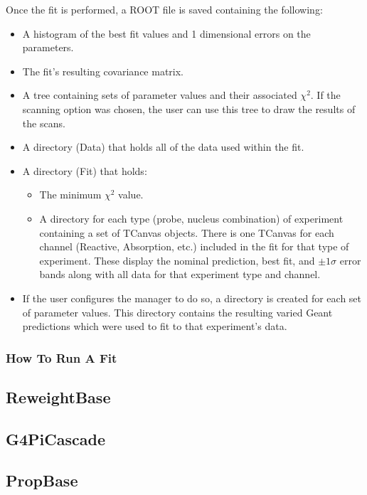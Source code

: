 \documentclass[12pt]{article}
\begin{document}
Once the fit is performed, a ROOT file is saved containing the following:
\begin{itemize}
	\item A histogram of the best fit values and 1 dimensional errors on the parameters.
	\item The fit's resulting covariance matrix.
	\item A tree containing sets of parameter values and their associated $\chi^2$. If the scanning option was chosen, the user can use this tree to draw the results of the scans.
	\item A directory (Data) that holds all of the data used within the fit.
	\item A directory (Fit) that holds:
	\begin{itemize}
		\item The minimum $\chi^2$ value.
		\item A directory for each type (probe, nucleus combination) of experiment containing a set of TCanvas objects. There is one TCanvas for each channel (Reactive, Absorption, etc.) included in the fit for that type of experiment. These display the nominal prediction, best fit, and $\pm 1\sigma$ error bands along with all  data for that experiment type and channel.
	\end{itemize}
    \item If the user configures the manager to do so, a directory is created for each set of parameter values. This directory contains the resulting varied Geant predictions which were used to fit to that experiment's data.
\end{itemize}

\subsubsection{How To Run A Fit}

\subsection{ReweightBase}

\subsection{G4PiCascade}

\subsection{PropBase}
\end{document}
